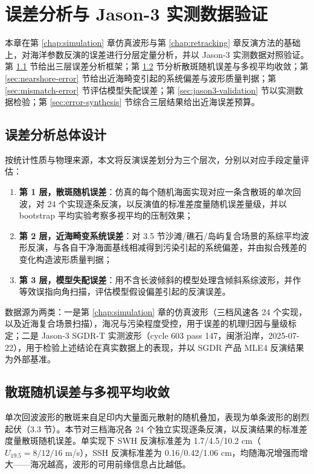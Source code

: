 \documentclass[a4paper]{article}
\newcommand{\sectionbreak}{\clearpage} %
\begin{document}
\sectionbreak

\section{误差分析与 Jason-3 实测数据验证}
\label{chap:error}

本章在第 \ref{chap:simulation} 章仿真波形与第 \ref{chap:retracking} 章反演方法的基础上，对海洋参数反演的误差进行分层定量分析，并以 Jason-3 实测数据对照验证。第 \ref{sec:error-design} 节给出三层误差分析框架；第 \ref{sec:speckle-error} 节分析散斑随机误差与多视平均收敛；第 \ref{sec:nearshore-error} 节给出近海畸变引起的系统偏差与波形质量判据；第 \ref{sec:mismatch-error} 节评估模型失配误差；第 \ref{sec:jason3-validation} 节以实测数据检验；第 \ref{sec:error-synthesis} 节综合三层结果给出近海误差预算。

\subsection{误差分析总体设计}
\label{sec:error-design}

按统计性质与物理来源，本文将反演误差划分为三个层次，分别以对应手段定量评估：
\begin{enumerate}
	\item \textbf{第 1 层，散斑随机误差}：仿真的每个随机海面实现对应一条含散斑的单次回波，对 24 个实现逐条反演，以反演值的标准差度量随机误差量级，并以 bootstrap 平均实验考察多视平均的压制效果；
	\item \textbf{第 2 层，近海畸变系统误差}：对 3.5 节沙滩/礁石/岛屿复合场景的系综平均波形反演，与各自干净海面基线相减得到污染引起的系统偏差，并由拟合残差的变化构造波形质量判据；
	\item \textbf{第 3 层，模型失配误差}：用不含长波倾斜的模型处理含倾斜系综波形，并作等效误指向角扫描，评估模型假设偏差引起的反演误差。
\end{enumerate}

数据源为两类：一是第 \ref{chap:simulation} 章的仿真波形（三档风速各 24 个实现，以及近海复合场景扫描），海况与污染程度受控，用于误差的机理归因与量级标定；二是 Jason-3 SGDR-T 实测波形（cycle 603 pass 147，闽浙沿岸，2025-07-22），用于检验上述结论在真实数据上的表现，并以 SGDR 产品 MLE4 反演结果为外部基准。

\subsection{散斑随机误差与多视平均收敛}
\label{sec:speckle-error}
单次回波波形的散斑来自足印内大量面元散射的随机叠加，表现为单条波形的剧烈起伏（3.3 节）。本节对三档海况各 24 个独立实现逐条反演，以反演结果的标准差度量散斑随机误差。单实现下 SWH 反演标准差为 1.7/4.5/10.2 cm（$U_{19.5} = 8/12/16$ m/s），SSH 反演标准差为 0.16/0.42/1.06 cm，均随海况增强而增大——海况越高，波形的可用前缘信息占比越低。
\end{document}
